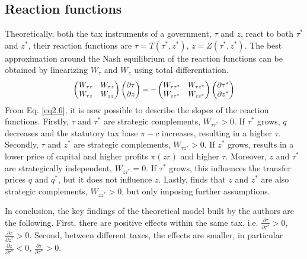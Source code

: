 \subsection{Reaction functions} \label{reaction_functions}
Theoretically, both the tax instruments of a government, $\tau$ and $z$, react to both $\tau^*$ and $z^*$, their reaction functions are $\tau=T(\tau^*,z^*)$, $z=Z(\tau^*,z^*)$. The best approximation around the Nash equilibrium of the reaction functions can be obtained by linearizing $W_\tau$ and $W_z$ using total differentiation.
\begin{equation}\label{eq2.6}
\scalemath{0.90}{\left(
\begin{matrix}
W_{\tau\tau} & W_{\tau z} \\
W_{\tau z} & W_{zz}
\end{matrix}
\right)
\left(
\begin{matrix}
\partial \tau \\
\partial z
\end{matrix}
\right)=-
\left(
\begin{matrix}
W_{\tau\tau^*} & W_{\tau z^*} \\
W_{z \tau^*} & W_{zz^*}
\end{matrix}
\right)
\left(
\begin{matrix}
\partial \tau^* \\
\partial z^*
\end{matrix}
\right)}
\end{equation}
From Eq. \ref{eq2.6}, it is now possible to describe the slopes of the reaction functions. Firstly, $\tau$ and $\tau^*$ are strategic complements, $W_{\tau\tau^*}>0$. If $\tau^*$ grows, $q$ decreases and the statutory tax base $\pi-c$ increases, resulting in a higher $\tau$. Secondly, $\tau$ and $z^*$ are strategic complements, $W_{\tau z^*}>0$. If $z^*$ grows, results in a lower price of capital and higher profits $\pi(zr)$ and higher $\tau$. Moreover, $z$ and $\tau^*$ are strategically independent, $W_{z\tau^*}=0$. If $\tau^*$ grows, this influences the transfer prices $q$ and $q^*$, but it does not influence $z$. Lastly, \textcite{dev-loc-red-08} finds that $z$ and $z^*$ are also strategic complements, $W_{z z^*}>0$, but only imposing further assumptions.

In conclusion, the key findings of the theoretical model built by  the authors are the following. First, there are positive effects within the same tax, i.e. $\frac{\partial \tau}{\partial \tau^*}>0$, $\frac{\partial z}{\partial z^*}>0$. Second, between different taxes, the effects are smaller, in particular $\frac{\partial z}{\partial \tau^*}<0$, $\frac{\partial \tau}{\partial z^*}>0$.
\vspace{-10pt}
